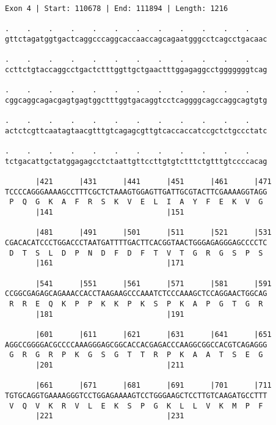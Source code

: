 \documentclass{article}
\begin{document}
\begin{Verbatim}
Exon 4 | Start: 110678 | End: 111894 | Length: 1216
 
.    .    .    .    .    .    .    .    .    .    .    .    
gttctagatggtgactcaggcccaggcaccaaccagcagaatgggcctcagcctgacaac
                                                            
.    .    .    .    .    .    .    .    .    .    .    .    
ccttctgtaccaggcctgactctttggttgctgaactttggagaggcctgggggggtcag
                                                            
.    .    .    .    .    .    .    .    .    .    .    .    
cggcaggcagacgagtgagtggctttggtgacaggtcctcaggggcagccaggcagtgtg
                                                            
.    .    .    .    .    .    .    .    .    .    .    .    
actctcgttcaatagtaacgtttgtcagagcgttgtcaccaccatccgctctgccctatc
                                                            
.    .    .    .    .    .    .    .    .    .    .    .    
tctgacattgctatggagagcctctaattgttccttgtgtctttctgtttgtccccacag
                                                            
       |421      |431      |441      |451      |461      |471
TCCCCAGGGAAAAGCCTTTCGCTCTAAAGTGGAGTTGATTGCGTACTTCGAAAAGGTAGG
 P  Q  G  K  A  F  R  S  K  V  E  L  I  A  Y  F  E  K  V  G 
       |141                          |151                   
  
       |481      |491      |501      |511      |521      |531
CGACACATCCCTGGACCCTAATGATTTTGACTTCACGGTAACTGGGAGAGGGAGCCCCTC
 D  T  S  L  D  P  N  D  F  D  F  T  V  T  G  R  G  S  P  S 
       |161                          |171                   
  
       |541      |551      |561      |571      |581      |591
CCGGCGAGAGCAGAAACCACCTAAGAAGCCCAAATCTCCCAAAGCTCCAGGAACTGGCAG
 R  R  E  Q  K  P  P  K  K  P  K  S  P  K  A  P  G  T  G  R 
       |181                          |191                   
  
       |601      |611      |621      |631      |641      |651
AGGCCGGGGACGCCCCAAAGGGAGCGGCACCACGAGACCCAAGGCGGCCACGTCAGAGGG
 G  R  G  R  P  K  G  S  G  T  T  R  P  K  A  A  T  S  E  G 
       |201                          |211                   
  
       |661      |671      |681      |691      |701      |711
TGTGCAGGTGAAAAGGGTCCTGGAGAAAAGTCCTGGGAAGCTCCTTGTCAAGATGCCTTT
 V  Q  V  K  R  V  L  E  K  S  P  G  K  L  L  V  K  M  P  F 
       |221                          |231                   
  

\end{Verbatim}
\end{document}
